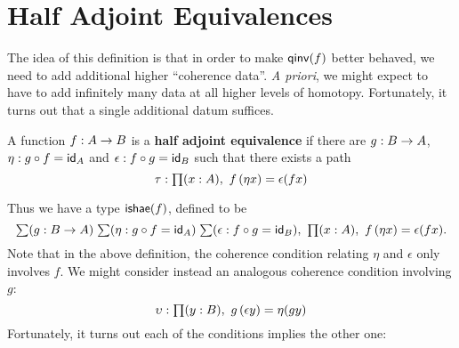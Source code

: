 \section{Half Adjoint Equivalences}

The idea of this definition is that in order to make $\qinv(f)$ better behaved, we need to add additional higher ``coherence data''.
\emph{A priori}, we might expect to have to add infinitely many data at all higher levels of homotopy.
Fortunately, it turns out that a single additional datum suffices.

\begin{defn}
  A function $f:A\ra B$ is a \textbf{half adjoint equivalence} if there are $g:B\ra A$, $\eta: g \circ f = \idfunc[A]$ and $\epsilon:f \circ g = \idfunc[B]$ such that there exists a path
  \[\tau : \prd{x:A} \map{f}{\eta x} = \epsilon(fx)\]
\end{defn}
Thus we have a type $\ishae(f)$, defined to be
\begin{equation*}
  \sm{g:B\to A}{\eta: g \circ f = \idfunc[A]}{\epsilon:f \circ g = \idfunc[B]} \prd{x:A} \map{f}{\eta x} = \epsilon(fx) .
\end{equation*}
Note that in the above definition, the coherence condition relating $\eta$ and $\epsilon$ only involves $f$.
We might consider instead an analogous coherence condition involving $g$:
\[\upsilon : \prd{y:B} \map{g}{\epsilon y} = \eta(gy)\]
Fortunately, it turns out each of the conditions implies the other one:

